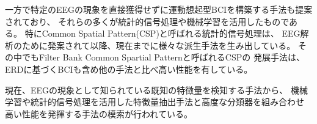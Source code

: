 一方で特定のEEGの現象を直接獲得せずに運動想起型BCIを構築する手法も提案されており、
それらの多くが統計的信号処理や機械学習を活用したものである。
特にCommon Spatial Pattern(CSP)と呼ばれる統計的信号処理\cite{CSP1990,CSP1999}は、
EEG解析のために発案されて以降、現在までに様々な派生手法を生み出している\cite{csssp,正則化CSP,カーネルCSP,cvscsp}。
その中でもFilter Bank Common Spartial Pattern\cite{fbcsp}と呼ばれるCSPの
発展手法は、ERDに基づくBCIも含め他の手法と比べ高い性能を有している。

現在、EEGの現象として知られている既知の特徴量を検知する手法から、
機械学習や統計的信号処理を活用した特徴量抽出手法と高度な分類器を組み合わせ
高い性能を発揮する手法の模索が行われている\cite{BCIの比較}。
